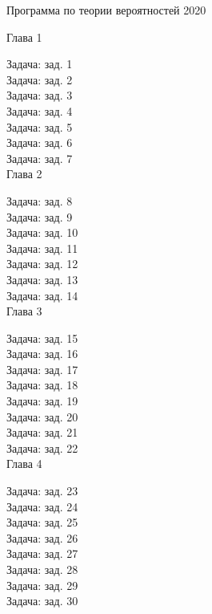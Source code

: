 \documentclass[10pt]{amsart}
\begin{document}
\thispagestyle{empty}

\begin{center}
    {\Large Программа по теории вероятностей 2020}
\end{center}

Глава 1

Задача: зад. 1 \\ 

Задача: зад. 2 \\

Задача: зад. 3 \\ 

Задача: зад. 4 \\ 

Задача: зад. 5 \\ 

Задача: зад. 6 \\

Задача: зад. 7 \\ 

Глава 2

Задача: зад. 8 \\ 

Задача: зад. 9 \\ 

Задача: зад. 10 \\

Задача: зад. 11 \\ 

Задача: зад. 12 \\ 

Задача: зад. 13 \\ 

Задача: зад. 14 \\

Глава 3

Задача: зад. 15 \\ 

Задача: зад. 16 \\ 

Задача: зад. 17 \\ 

Задача: зад. 18 \\

Задача: зад. 19 \\ 

Задача: зад. 20 \\ 

Задача: зад. 21 \\ 

Задача: зад. 22 \\

Глава 4

Задача: зад. 23 \\ 

Задача: зад. 24 \\ 

Задача: зад. 25 \\ 

Задача: зад. 26 \\

Задача: зад. 27 \\ 

Задача: зад. 28 \\ 

Задача: зад. 29 \\ 

Задача: зад. 30 \\
\end{document}
